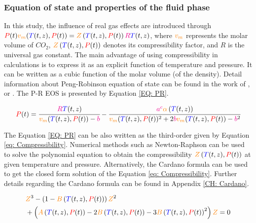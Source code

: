 \documentclass[../Article_Model_Parameters.tex]{subfiles}
\begin{document}
	
	\label{CH: Thermodynamic_details}
	
	\subsubsection{Equation of state and properties of the fluid phase} \label{subsubsec: Equation of state}
	In this study, the influence of real gas effects are introduced through ${\color{red}P}(t) {\color{orange}v_m}({\color{blue}T}(t,z),{\color{red}P}(t)) = {\color{orange}Z}\left({\color{blue}T}(t,z), {\color{red}P}(t)\right){\color{magenta}R}{\color{blue}T}(t,z)$, where ${\color{orange}v_m}$ represents the molar volume of $CO_2$, ${\color{orange}Z}\left({\color{blue}T}(t,z), {\color{red}P}(t)\right)$ denotes its compressibility factor, and $R$ is the universal gas constant. The main advantage of using compressibility in calculations is to express it as an explicit function of temperature and pressure. It can be written as a cubic function of the molar volume (of the density). Detail information about Peng-Robinson equation of state can be found in the work of \citet{Peng1976}, \citet{Elliott2011} or \citet{Pratt2001}. The P-R EOS is presented by Equation \ref{EQ: PR}.
	
	{\footnotesize
		\begin{equation}
			{\color{red}P}(t) = \cfrac{{\color{magenta}R}{\color{blue}T}(t,z)}{{\color{orange}v_m}({\color{blue}T}(t,z),{\color{red}P}(t)) - {\color{magenta}b}} - \cfrac{{\color{magenta}a^c}{\color{orange}\alpha}\left({\color{blue}T}(t,z)\right)}{{\color{orange}v_m}({\color{blue}T}(t,z),{\color{red}P}(t))^2 + 2{\color{magenta}b}{\color{orange}v_m}({\color{blue}T}(t,z),{\color{red}P}(t)) - {\color{magenta}b}^2}
			\label{EQ: PR}
		\end{equation}
	}

	The Equation \ref{EQ: PR} can be also written as the third-order given by Equation \ref{eq: Compressibility}. Numerical methods such as Newton-Raphson can be used to solve the polynomial equation to obtain the compressibility ${\color{orange}Z}\left({\color{blue}T}(t,z), {\color{red}P}(t)\right)$ at given temperature and pressure. Alternatively, the Cardano formula can be used to get the closed form solution of the Equation \ref{eq: Compressibility}. Further details regarding the Cardano formula can be found in Appendix \ref{CH: Cardano}.
	
	{\footnotesize	
	\begin{equation}\label{eq: Compressibility}
	\begin{aligned}
		&{\color{orange}Z}^3 - \left(1 - {\color{orange}B}\left({\color{blue}T}(t,z), {\color{red}P}(t)\right)\right) {\color{orange}Z}^2 \\
		&+ \left({\color{orange}A}\left({\color{blue}T}(t,z), {\color{red}P}(t)\right) - 2{\color{orange}B}\left({\color{blue}T}(t,z), {\color{red}P}(t)\right) - 3{\color{orange}B}\left({\color{blue}T}(t,z), {\color{red}P}(t)\right)^2\right) {\color{orange}Z} = 0
	\end{aligned} \end{equation} }
\end{document}
